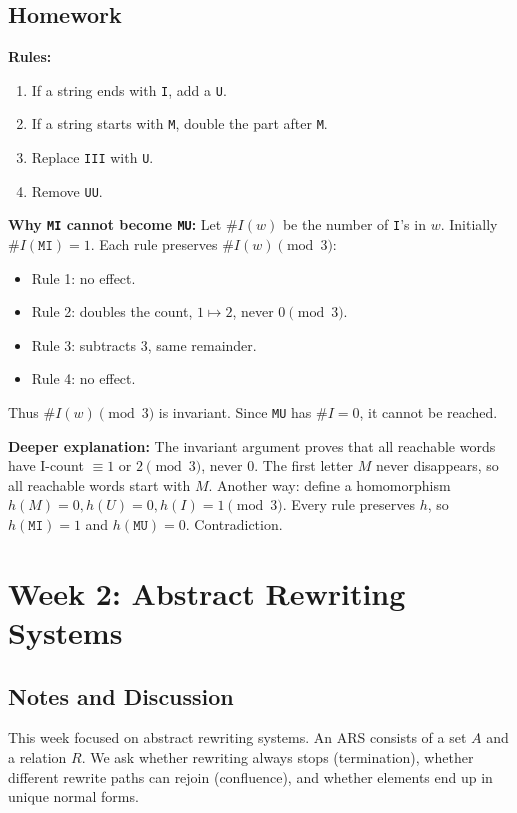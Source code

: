 \documentclass{article}
\theoremstyle{theorem}
\theoremstyle{definition}
\theoremstyle{remark}
\begin{document}
\subsection{Homework}
\textbf{Rules:}
\begin{enumerate}
  \item If a string ends with \texttt{I}, add a \texttt{U}.
  \item If a string starts with \texttt{M}, double the part after \texttt{M}.
  \item Replace \texttt{III} with \texttt{U}.
  \item Remove \texttt{UU}.
\end{enumerate}

\textbf{Why \texttt{MI} cannot become \texttt{MU}:}  
Let $\#I(w)$ be the number of \texttt{I}'s in $w$. Initially $\#I(\texttt{MI})=1$. 
Each rule preserves $\#I(w) \pmod{3}$:
\begin{itemize}
  \item Rule 1: no effect.
  \item Rule 2: doubles the count, $1 \mapsto 2$, never $0 \pmod 3$.
  \item Rule 3: subtracts 3, same remainder.
  \item Rule 4: no effect.
\end{itemize}
Thus $\#I(w) \pmod{3}$ is invariant. Since \texttt{MU} has $\#I=0$, it cannot be reached.

\textbf{Deeper explanation:}  
The invariant argument proves that all reachable words have I-count $\equiv 1$ or $2 \pmod{3}$, never 0.  
The first letter $M$ never disappears, so all reachable words start with $M$.  
Another way: define a homomorphism $h(M)=0, h(U)=0, h(I)=1 \pmod 3$. 
Every rule preserves $h$, so $h(\texttt{MI})=1$ and $h(\texttt{MU})=0$. Contradiction.  

\section{Week 2: Abstract Rewriting Systems}

\subsection{Notes and Discussion}
This week focused on abstract rewriting systems. 
An ARS consists of a set $A$ and a relation $R$. 
We ask whether rewriting always stops (termination), whether different rewrite paths can rejoin (confluence), and whether elements end up in unique normal forms.
\end{document}
